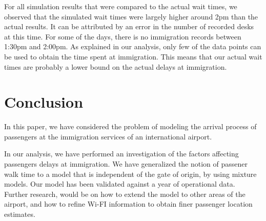 \documentclass[11pt,onecolumn]{IEEEtran}
\begin{document}
For all simulation results that were compared to the actual wait times, we observed that the simulated wait times were largely higher around 2pm than the actual results. It can be attributed by an error in the number of recorded desks at this time. For some of the days, there is no immigration records between 1:30pm and 2:00pm.
As explained in our analysis, only few of the data points can be used to obtain the time spent at immigration. This means that our actual wait times are probably a lower bound on the actual delays at immigration.
\newpage
\clearpage
\section{Conclusion}
In this paper, we have considered the problem of modeling the arrival process of passengers at the immigration services of an international airport. 
 
In our analysis, we have performed an investigation of the factors affecting passengers delays at immigration. We have generalized the notion of passener walk time to a model that is independent of the gate of origin, by using mixture models. Our model has been validated against a year of operational data.\\
Further research, would be on how to extend the model to other areas of the airport, and how to refine Wi-FI information to obtain finer passenger location estimates.
\newpage


\end{document}
